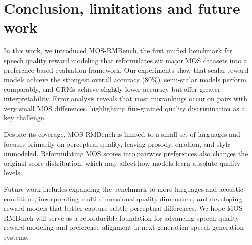 \section{Conclusion, limitations and future work}


In this work, we introduced MOS-RMBench, the first unified benchmark for speech quality reward modeling that reformulates six major MOS datasets into a preference-based evaluation framework. Our experiments show that scalar reward models achieve the strongest overall accuracy (80\%), semi-scalar models perform comparably, and GRMs achieve slightly lower accuracy but offer greater interpretability. Error analysis reveals that most misrankings occur on pairs with very small MOS differences, highlighting fine-grained quality discrimination as a key challenge.

Despite its coverage, MOS-RMBench is limited to a small set of languages and focuses primarily on perceptual quality, leaving prosody, emotion, and style unmodeled. Reformulating MOS scores into pairwise preferences also changes the original score distribution, which may affect how models learn absolute quality levels.

Future work includes expanding the benchmark to more languages and acoustic conditions, incorporating multi-dimensional quality dimensions, and developing reward models that better capture subtle perceptual differences. We hope MOS-RMBench will serve as a reproducible foundation for advancing speech quality reward modeling and preference alignment in next-generation speech generation systems.